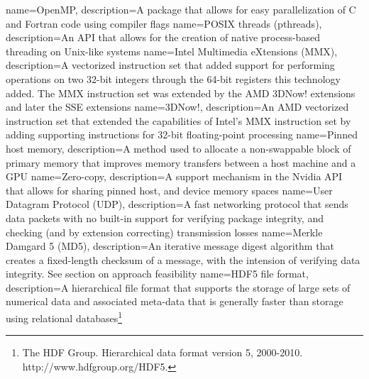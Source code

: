  {
  name={OpenMP},
  description={A package that allows for easy parallelization of C and Fortran code using compiler flags}
 }
 {
  name={POSIX threads (pthreads)},
  description={An API that allows for the creation of native process-based threading on Unix-like systems}
 }
 {
  name={Intel Multimedia eXtensions (MMX)},
  description={A vectorized instruction set that added support for performing operations on two 32-bit integers through the 64-bit registers this technology added.
  The MMX instruction set was extended by the AMD 3DNow! extensions and later the SSE extensions}
 }
 {
  name={3DNow!},
  description={An AMD vectorized instruction set that extended the capabilities of Intel's MMX instruction set by adding supporting instructions for 32-bit floating-point 
  processing}
 }
 {
  name={Pinned host memory},
  description={A method used to allocate a non-swappable block of primary memory that improves memory transfers between a host machine and a GPU}
 }
 {
  name={Zero-copy},
  description={A support mechanism in the Nvidia API that allows for sharing pinned host, and device memory spaces}
 } 
 {
  name={User Datagram Protocol (UDP)},
  description={A fast networking protocol that sends data packets with no built-in support for verifying package integrity, and checking (and by extension correcting) 
  transmission losses}
 }
 {
  name={Merkle Damgard 5 (MD5)},
  description={An iterative message digest algorithm that creates a fixed-length checksum of a message, with the intension of verifying data integrity. See section
  on approach feasibility}
 }
 {
  name={HDF5 file format},
  description={A hierarchical file format that supports the storage of large sets of numerical data and associated meta-data that is generally faster than
  storage using relational databases\footnote{The HDF Group. Hierarchical data format version 5, 2000-2010. http://www.hdfgroup.org/HDF5.}}
 }